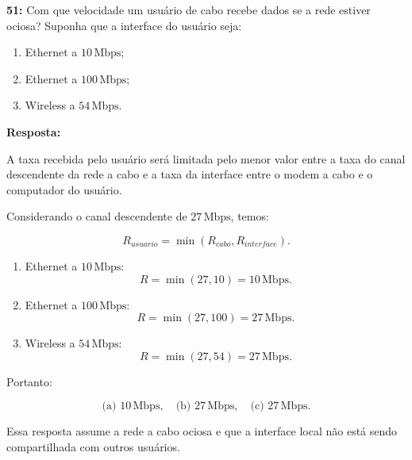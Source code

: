 \documentclass[12pt,a4paper]{report}
\begin{document}
\vspace{0.6cm}

\noindent \textbf{51:} Com que velocidade um usuário de cabo recebe dados se a rede estiver ociosa? Suponha que a interface do usuário seja:
\begin{enumerate}
    \item[(a)] Ethernet a $10\,\text{Mbps}$;
    \item[(b)] Ethernet a $100\,\text{Mbps}$;
    \item[(c)] Wireless a $54\,\text{Mbps}$.
\end{enumerate}
\textbf{Resposta:}

A taxa recebida pelo usuário será limitada pelo menor valor entre a taxa do canal descendente da rede a cabo e a taxa da interface entre o modem a cabo e o computador do usuário.

Considerando o canal descendente de $27\,\text{Mbps}$, temos:

\[
R_{usuario} = \min(R_{cabo}, R_{interface}).
\]

\begin{enumerate}
    \item[(a)] Ethernet a $10\,\text{Mbps}$:
    \[
    R = \min(27,10) = 10\,\text{Mbps}.
    \]

    \item[(b)] Ethernet a $100\,\text{Mbps}$:
    \[
    R = \min(27,100) = 27\,\text{Mbps}.
    \]

    \item[(c)] Wireless a $54\,\text{Mbps}$:
    \[
    R = \min(27,54) = 27\,\text{Mbps}.
    \]
\end{enumerate}

Portanto:

\[
\boxed{\text{(a) }10\,\text{Mbps}, \quad \text{(b) }27\,\text{Mbps}, \quad \text{(c) }27\,\text{Mbps}.}
\]

Essa resposta assume a rede a cabo ociosa e que a interface local não está sendo compartilhada com outros usuários.


\vspace{0.6cm}
\end{document}
